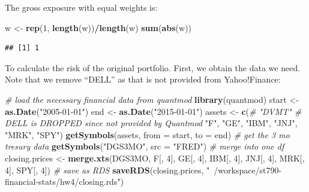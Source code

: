 \documentclass[11pt,]{article}
\newenvironment{Shaded}{\begin{snugshade}}{\end{snugshade}}
\newcommand{\KeywordTok}[1]{\textcolor[rgb]{0.13,0.29,0.53}{\textbf{#1}}}
\newcommand{\DataTypeTok}[1]{\textcolor[rgb]{0.13,0.29,0.53}{#1}}
\newcommand{\DecValTok}[1]{\textcolor[rgb]{0.00,0.00,0.81}{#1}}
\newcommand{\StringTok}[1]{\textcolor[rgb]{0.31,0.60,0.02}{#1}}
\newcommand{\CommentTok}[1]{\textcolor[rgb]{0.56,0.35,0.01}{\textit{#1}}}
\newcommand{\OperatorTok}[1]{\textcolor[rgb]{0.81,0.36,0.00}{\textbf{#1}}}
\newcommand{\NormalTok}[1]{#1}
\renewenvironment{quote}{\begin{shaded*}}{\end{shaded*}}
\begin{document}
\begin{quote}
The gross exposure with equal weights is:
\end{quote}

\begin{Shaded}
\begin{Highlighting}[]
\NormalTok{w <-}\StringTok{ }\KeywordTok{rep}\NormalTok{(}\DecValTok{1}\NormalTok{, }\KeywordTok{length}\NormalTok{(w))}\OperatorTok{/}\KeywordTok{length}\NormalTok{(w)}
\KeywordTok{sum}\NormalTok{(}\KeywordTok{abs}\NormalTok{(w))}
\end{Highlighting}
\end{Shaded}

\begin{verbatim}
## [1] 1
\end{verbatim}

\begin{quote}
To calculate the risk of the original portfolio. First, we obtain the
data we need. Note that we remove ``DELL'' as that is not provided from
Yahoo!Finance:
\end{quote}

\begin{Shaded}
\begin{Highlighting}[]
\CommentTok{# load the necessary financial data from quantmod }
\KeywordTok{library}\NormalTok{(quantmod)}
\NormalTok{start <-}\StringTok{ }\KeywordTok{as.Date}\NormalTok{(}\StringTok{"2005-01-01"}\NormalTok{)}
\NormalTok{end <-}\StringTok{ }\KeywordTok{as.Date}\NormalTok{(}\StringTok{"2015-01-01"}\NormalTok{)}
\NormalTok{assets <-}\StringTok{ }\KeywordTok{c}\NormalTok{(}\CommentTok{# "DVMT" # DELL is DROPPED since not provided by Quantmod}
  \StringTok{"F"}\NormalTok{, }
  \StringTok{"GE"}\NormalTok{, }
  \StringTok{"IBM"}\NormalTok{, }
  \StringTok{"JNJ"}\NormalTok{,}
  \StringTok{"MRK"}\NormalTok{,}
  \StringTok{"SPY"}\NormalTok{)}
\KeywordTok{getSymbols}\NormalTok{(assets, }\DataTypeTok{from =}\NormalTok{ start, }\DataTypeTok{to =}\NormalTok{ end) }
\CommentTok{# get the 3 mo tresury data }
\KeywordTok{getSymbols}\NormalTok{(}\StringTok{"DGS3MO"}\NormalTok{, }\DataTypeTok{src =} \StringTok{"FRED"}\NormalTok{)}
\CommentTok{# merge into one df }
\NormalTok{closing.prices <-}\StringTok{ }\KeywordTok{merge.xts}\NormalTok{(DGS3MO, }
\NormalTok{                            F[, }\DecValTok{4}\NormalTok{], }
\NormalTok{                            GE[, }\DecValTok{4}\NormalTok{],}
\NormalTok{                            IBM[, }\DecValTok{4}\NormalTok{], }
\NormalTok{                            JNJ[, }\DecValTok{4}\NormalTok{], }
\NormalTok{                            MRK[, }\DecValTok{4}\NormalTok{], }
\NormalTok{                            SPY[, }\DecValTok{4}\NormalTok{])}
\CommentTok{# save as RDS }
\KeywordTok{saveRDS}\NormalTok{(closing.prices, }\StringTok{"~/workspace/st790-financial-stats/hw4/closing.rds"}\NormalTok{)}
\end{Highlighting}
\end{Shaded}
\end{document}
